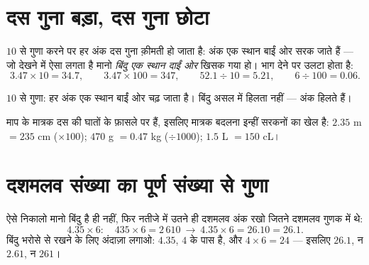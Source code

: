\section{दस गुना बड़ा, दस गुना छोटा}

\begin{proposition}[10, 100, 1000 से गुणा और भाग]\label{prop:g5:decimalops:shift}
$10$ से गुणा करने पर हर अंक दस गुना क़ीमती हो जाता है: अंक एक
स्थान बाईं ओर सरक जाते हैं --- जो देखने में ऐसा लगता है मानो
\emph{बिंदु एक स्थान दाईं ओर} खिसक गया हो। भाग देने पर उलटा होता है:
\[
3.47 \times 10 = 34.7, \qquad
3.47 \times 100 = 347, \qquad
52.1 \div 10 = 5.21, \qquad
6 \div 100 = 0.06 .
\]
\end{proposition}
\admitted

\begin{omfigure}

{\small $10$ से गुणा: हर अंक एक स्थान बाईं ओर चढ़ जाता है। बिंदु
असल में हिलता नहीं --- अंक हिलते हैं।}
\end{omfigure}

\begin{example}[फिर से मात्रक बदलना]\label{ex:g5:decimalops:convert}
माप के मात्रक दस की घातों के फ़ासले पर हैं, इसलिए मात्रक बदलना
इन्हीं सरकनों का खेल है: $2.35$ m $= 235$ cm ($\times 100$);
$470$ g $= 0.47$ kg ($\div 1000$); $1.5$ L $= 150$ cL।
\end{example}

\section{दशमलव संख्या का पूर्ण संख्या से गुणा}

\begin{method}[दशमलव गुना पूर्ण]\label{met:g5:decimalops:mult}
ऐसे निकालो मानो बिंदु है ही नहीं, फिर नतीजे में उतने ही दशमलव
अंक रखो जितने दशमलव गुणक में थे:
\[
4.35 \times 6: \quad 435 \times 6 = 2\,610
\ \to\ 4.35 \times 6 = 26.10 = 26.1 .
\]
बिंदु भरोसे से रखने के लिए अंदाज़ा लगाओ: $4.35$, $4$ के पास है,
और $4 \times 6 = 24$ --- इसलिए $26.1$, न $2.61$, न $261$।
\end{method}

